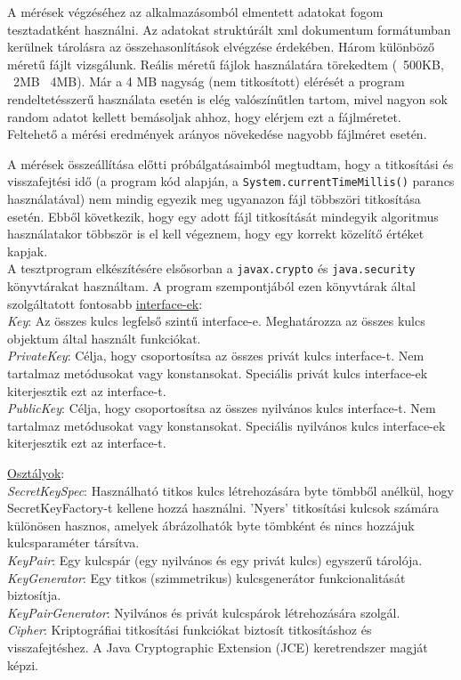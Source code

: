 \vspace{25pt}

A mérések végzéséhez az alkalmazásomból elmentett adatokat fogom tesztadatként használni. Az adatokat struktúrált xml dokumentum formátumban kerülnek tárolásra az összehasonlítások elvégzése érdekében. Három különböző méretű fájlt vizsgálunk. Reális méretű fájlok használatára törekedtem (~500KB, ~2MB ~4MB). Már a 4 MB nagyság (nem titkosított) elérését a program rendeltetésszerű használata esetén is elég valószínűtlen tartom, mivel nagyon sok random adatot kellett bemásoljak ahhoz, hogy elérjem ezt a fájlméretet. 
\vspace{5pt}\\Feltehető a mérési eredmények arányos növekedése nagyobb fájlméret esetén.

\noindent A mérések összeállítása előtti próbálgatásaimból megtudtam, hogy a titkosítási és visszafejtési idő (a program kód alapján, a \texttt{System.currentTimeMillis()} parancs használatával) nem mindig egyezik meg ugyanazon fájl többszöri titkosítása esetén. Ebből következik, hogy egy adott fájl titkosítását mindegyik algoritmus használatakor többször is el kell végeznem, hogy egy korrekt közelítő értéket kapjak.
\vspace{5pt}\\A tesztprogram elkészítésére elsősorban a \texttt{javax.crypto} és \texttt{java.security} könyvtárakat használtam. A program szempontjából ezen könyvtárak által szolgáltatott fontosabb
\underline{interface-ek}:
\\\textit{Key}: Az összes kulcs legfelső szintű interface-e. Meghatározza az összes kulcs objektum által használt funkciókat.
\\\textit{PrivateKey}: Célja, hogy csoportosítsa az összes privát kulcs interface-t. Nem tartalmaz metódusokat vagy konstansokat. Speciális privát kulcs interface-ek kiterjesztik ezt az interface-t. 
\\\textit{PublicKey}: Célja, hogy csoportosítsa az összes nyilvános kulcs interface-t. Nem tartalmaz metódusokat vagy konstansokat. Speciális nyilvános kulcs interface-ek kiterjesztik ezt az interface-t. \newline

\noindent \underline{Osztályok}:
\\\textit{SecretKeySpec}: Használható titkos kulcs létrehozására byte tömbből anélkül, hogy SecretKeyFactory-t kellene hozzá használni. ’Nyers’ titkosítási kulcsok számára különösen hasznos, amelyek ábrázolhatók byte tömbként és nincs hozzájuk kulcsparaméter társítva.
\\\textit{KeyPair}: Egy kulcspár (egy nyilvános és egy privát kulcs) egyszerű tárolója.
\\\textit{KeyGenerator}: Egy titkos (szimmetrikus) kulcsgenerátor funkcionalitását biztosítja.
\\\textit{KeyPairGenerator}: Nyilvános és privát kulcspárok létrehozására szolgál.
\\\textit{Cipher}: Kriptográfiai titkosítási funkciókat biztosít titkosításhoz és visszafejtéshez. A Java Cryptographic Extension (JCE) keretrendszer magját képzi. \newline

